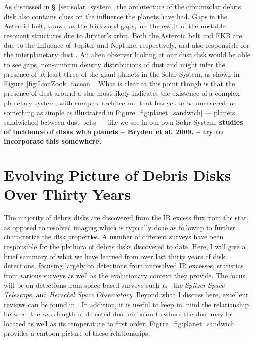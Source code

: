     As discussed in \S~\ref{sec:solar_system}, the architecture of the circumsolar debris disk also contains clues on the influence the planets have had. Gaps in the Asteroid belt, known as the Kirkwood gaps, are the result of the unstable resonant structures due to Jupiter's orbit. Both the Asteroid belt and EKB are due to the influence of Jupiter and Neptune, respectively, and also responsible for the interplanetary dust \citep[e.g.,][]{Morbidelli2010}. An alien observer looking at our dust disk would be able to see gaps, non-uniform density distributions of dust and might infer the presence of at least three of the giant planets in the Solar System, as shown in Figure~\ref{fig:LiouZook_faceon} \citep{Liou1999}. What is clear at this point though is that the presence of dust around a star most likely indicates the existence of a complex planetary system, with complex architecture that has yet to be uncovered, or something as simple as illustrated in Figure~\ref{fig:planet_sandwich} --- planets sandwiched between dust belts --- like we see in our own Solar System. \textbf{studies of incidence of disks with planets -- Bryden et al. 2009. -- try to incorporate this somewhere.}    
    
    
\section{Evolving Picture of Debris Disks Over Thirty Years}\label{sec:thirty_years}
       
    The majority of debris disks are discovered from the IR excess flux from the star, as opposed to resolved imaging which is typically done as followup to further characterize the disk properties. A number of different surveys have been responsible for the plethora of debris disks discovered to date. Here, I will give a brief summary of what we have learned from over last thirty years of disk detections, focusing largely on detections from unresolved IR excesses, statistics from various surveys as well as the evolutionary context they provide. The focus will be on detections from space based surveys such as \iras\, the \textit{Spitzer Space Telescope}, and \textit{Herschel Space Observatory}. Beyond what I discuss here, excellent reviews can be found in \citet{Zuckerman2001, Wyatt2008, Matthews2014}.  In addition, it is useful to keep in mind the relationship between the wavelength of detected dust emission to where the dust may be located as well as its temperature to first order. Figure~\ref{fig:planet_sandwich} provides a cartoon picture of these relationships. 
   
